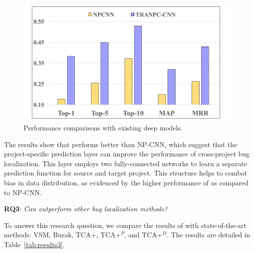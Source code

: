 \begin{figure}[hbt]
\centering
\includegraphics[width = \columnwidth]{pic/results2_avg.pdf}
\caption{Performance comparisons with existing deep models.}
\label{fig:results2}
\end{figure}

The results show that \TRANPCNN performs better than NP-CNN, which suggest that the project-specific prediction layer can improve the performance of cross-project bug localization. This layer employs two fully-connected networks to learn a separate prediction function for source and target project. This structure helps to combat bias in data distribution, as evidenced by the higher performance of \TRANPCNN as compared to NP-CNN.  

\textbf{RQ3}: \textit{Can \TRANPCNN outperform other bug localization methods?}

To answer this research question, we compare the results of \TRANPCNN with state-of-the-art methods: VSM, Burak, TCA+, TCA+$^P$, and TCA+$^D$. %
The results are detailed in Table~\ref{tab:results3}. 


